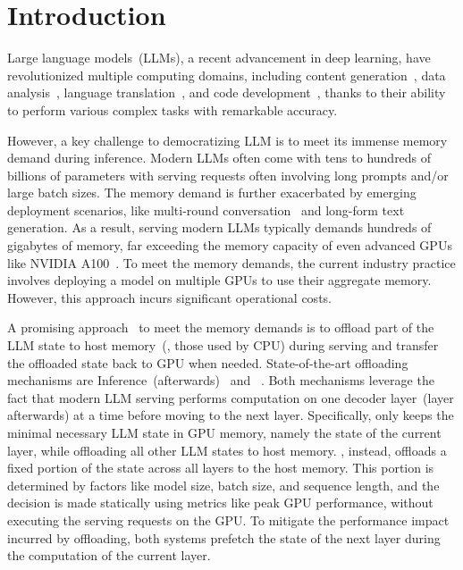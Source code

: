 \section{Introduction}
Large language models~(LLMs), a recent advancement in deep learning, 
have revolutionized multiple computing domains, including content generation~\cite{content1, content2, content3}, 
data analysis~\cite{dataanalyse1, dataanalyse2, dataanalyse3},  
language translation~\cite{translation1, translation2, translation3},  
and code development~\cite{code1, code2, code3, code4}, 
thanks to their ability to perform various complex tasks with remarkable accuracy. 

However, a key challenge to democratizing LLM is to meet its immense memory demand during inference.  
%
Modern LLMs often come with tens to hundreds of billions of parameters 
with serving requests often involving long prompts and/or large batch sizes.   
%
The memory demand is further exacerbated by emerging deployment scenarios, 
like multi-round conversation~\cite{cachedattention} and long-form text generation\cite{longform}.  
%
As a result, serving modern LLMs typically demands hundreds of gigabytes of 
memory, far exceeding the memory capacity of even advanced GPUs like NVIDIA A100~\cite{A100}. 
%
To meet the memory demands, the current industry practice involves deploying 
a model on multiple GPUs to use their aggregate memory. 
%
However, this approach incurs significant operational costs. 

A promising approach~\cite{lorazerooffload} to meet the memory demands is to offload part of 
the LLM state to host memory~(\ie, those used by CPU) during serving and 
transfer the offloaded state back to GPU when needed. 
State-of-the-art offloading mechanisms are \deepspeed Inference~(\deepspeed afterwards)~\cite{zero-infer} and \flexgen~\cite{flexgen}. 
%
Both mechanisms leverage the fact that modern LLM serving performs computation on 
one decoder layer~(layer afterwards) at a time before moving to the next layer. 
%
Specifically, \deepspeed only keeps the minimal necessary
LLM state in GPU memory, namely the state of the current layer, while offloading all other LLM states to host memory. 
%
\flexgen, instead, offloads a fixed portion of the state across all layers to the host memory. 
%
This portion is determined by factors like model size, batch size, and sequence length, and the decision is made statically using metrics like peak GPU performance, without executing the serving requests on the GPU.
%
%
To mitigate the performance impact incurred by offloading, both 
systems prefetch the state of the next layer during the computation of the current layer. 

